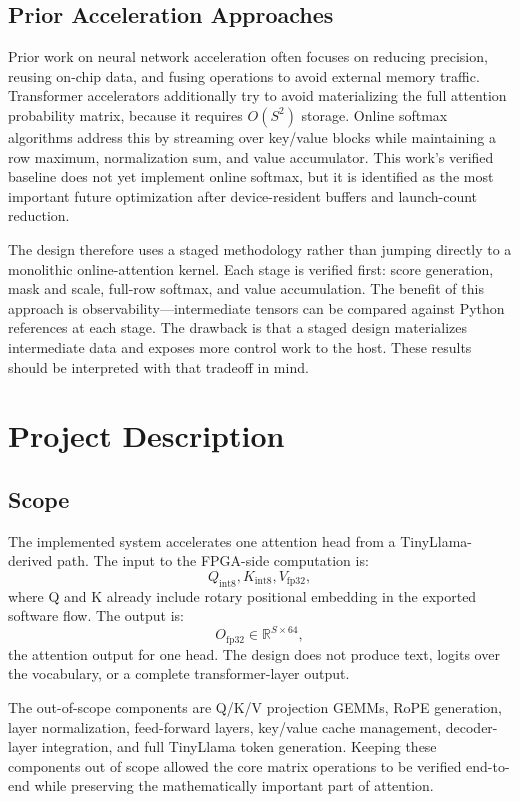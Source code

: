 \documentclass[conference]{IMSTemplate}
\begin{document}
\subsection{Prior Acceleration Approaches}

Prior work on neural network acceleration often focuses on reducing precision,
reusing on-chip data, and fusing operations to avoid external memory traffic.
Transformer accelerators additionally try to avoid materializing the full
attention probability matrix, because it requires \(O(S^2)\) storage. Online
softmax algorithms address this by streaming over key/value blocks while
maintaining a row maximum, normalization sum, and value accumulator. This
work's verified baseline does not yet implement online softmax, but it is
identified as the most important future optimization after device-resident
buffers and launch-count reduction.

The design therefore uses a staged methodology rather than jumping directly to
a monolithic online-attention kernel. Each stage is verified first: score
generation, mask and scale, full-row softmax, and value accumulation. The
benefit of this approach is observability---intermediate tensors can be compared
against Python references at each stage. The drawback is that a staged design
materializes intermediate data and exposes more control work to the host. These
results should be interpreted with that tradeoff in mind.

\section{Project Description}

\subsection{Scope}

The implemented system accelerates one attention head from a TinyLlama-derived
path. The input to the FPGA-side computation is:
\[
Q_{\mathrm{int8}}, K_{\mathrm{int8}}, V_{\mathrm{fp32}},
\]
where Q and K already include rotary positional embedding in the exported
software flow. The output is:
\[
O_{\mathrm{fp32}} \in \mathbb{R}^{S \times 64},
\]
the attention output for one head. The design does not produce text, logits
over the vocabulary, or a complete transformer-layer output.

The out-of-scope components are Q/K/V projection GEMMs, RoPE generation, layer
normalization, feed-forward layers, key/value cache management, decoder-layer
integration, and full TinyLlama token generation. Keeping these components out of scope allowed the core matrix operations to be
verified end-to-end while preserving the mathematically important part of
attention.
\end{document}
